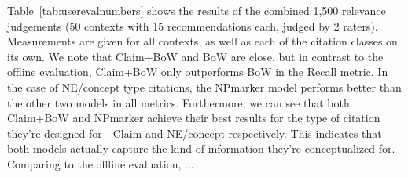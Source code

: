 Table~\ref{tab:userevalnumbers} shows the results of the combined 1,500 relevance judgements (50 contexts with 15 recommendations each, judged by 2 raters). Measurements are given for all contexts, as well as each of the citation classes on its own. We note that Claim+BoW and BoW are close, but in contrast to the offline evaluation, Claim+BoW only outperforms BoW in the Recall metric. In the case of NE/concept type citations, the NPmarker model performs better than the other two models in all metrics. Furthermore, we can see that both Claim+BoW and NPmarker achieve their best results for the type of citation they're designed for---Claim and NE/concept respectively. This indicates that both models actually capture the kind of information they're conceptualized for. Comparing to the offline evaluation, ... %
